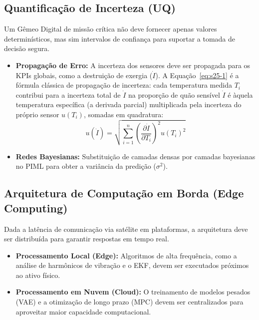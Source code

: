 \documentclass[12pt,a4paper]{article}
\numberwithin{equation}{section}
\numberwithin{table}{section}
\numberwithin{figure}{section}
\begin{document}
	\subsection{Quantificação de Incerteza (UQ)}
	Um Gêmeo Digital de missão crítica não deve fornecer apenas valores determinísticos, mas sim intervalos de confiança para suportar a tomada de decisão segura.
	\begin{itemize}
		\item \textbf{Propagação de Erro:} A incerteza dos sensores deve ser propagada para os KPIs globais, como a destruição de exergia ($\dot{I}$). A Equação~\eqref{eq:s25-1} é a fórmula clássica de propagação de incerteza: cada temperatura medida $T_i$ contribui para a incerteza total de $\dot{I}$ na proporção de quão sensível $\dot{I}$ é àquela temperatura específica (a derivada parcial) multiplicada pela incerteza do próprio sensor $u(T_i)$, somadas em quadratura:
		\begin{equation}\label{eq:s25-1}
 u(\dot{I}) = \sqrt{\sum_{i=1}^{n} \left( \frac{\partial \dot{I}}{\partial T_i} \right)^2 u(T_i)^2}
\end{equation}
		\item \textbf{Redes Bayesianas:} Substituição de camadas densas por camadas bayesianas no PIML para obter a variância da predição ($\sigma^2$).
	\end{itemize}
	
	\subsection{Arquitetura de Computação em Borda (Edge Computing)}
	Dada a latência de comunicação via satélite em plataformas, a arquitetura deve ser distribuída para garantir respostas em tempo real.
	\begin{itemize}
		\item \textbf{Processamento Local (Edge):} Algoritmos de alta frequência, como a análise de harmônicos de vibração e o EKF, devem ser executados próximos ao ativo físico.
		\item \textbf{Processamento em Nuvem (Cloud):} O treinamento de modelos pesados (VAE) e a otimização de longo prazo (MPC) devem ser centralizados para aproveitar maior capacidade computacional.
	\end{itemize}
	
\end{document}
